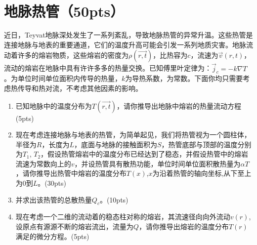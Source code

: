 \section{地脉热管（50pts）}
近日，Teyvat地脉深处发生了一系列紊乱，导致地脉热管的异常升温。这些热管是连接地脉与地表的重要通道，它们的温度升高可能会引发一系列地质灾害。地脉流动着许多的熔岩物质，这些熔岩的密度为\(\rho(\vec{r,t})\)，比热容为\(c\)，流速为\(\vec{v}(r,t)\)，流动的熔岩在地脉中具有许许多多的热量交换。已知傅里叶定律为：\(\vec{j}_c = -k \nabla T\)。为单位时间单位面积内传导的热量，\(k\)为导热系数，为常数。下面你均只需要考虑热传导和热对流，不考虑其他因素的影响。
\begin{enumerate}
	\item 已知地脉中的温度分布为\(T(\vec{r,t})\)，请你推导出地脉中熔岩的热量流动方程(5pts)
	\item 现在考虑连接地脉与地表的热管，为简单起见，我们将热管视为一个圆柱体，半径为\(R\)，长度为\(L\)，底面与地脉的接触面积为\(S\)，热管底部与顶部的温度分别为\(T_1\), \(T_2\)，假设热管熔岩中的温度分布已经达到了稳态，并假设热管中的熔岩流速为常数向上的\(v\)，并设热管具有散热功能，单位时间单位面积散热量为\(\alpha T\)，请你推导出热管中熔岩的温度分布\(T(x)\),\(x\)为沿着热管的轴向坐标,从下至上为\(0\)到\(L\)。(30pts)
	\item 并求出该热管的总散热量\(Q_c\)。(10pts)
	\item 现在考虑一个二维的流动着的稳态柱对称的熔岩，其流速径向向外流动\(v(r)\),设原点有源源不断的熔岩流出，流量为\(Q\)，请你推导出熔岩的温度分布\(T(r)\)满足的微分方程。(5pts)
\end{enumerate}

